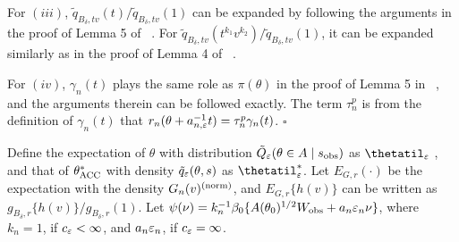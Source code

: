 \documentclass{article}
\begin{document}
	For $(iii)$, $\tilde{q}_{B_{\delta},tv}(t)/\tilde{q}_{B_{\delta},tv}(1)$
	can be expanded by following the arguments in the proof of Lemma 5
	of ~\cite{Li2016}. For $\tilde{q}_{B_{\delta},tv}(t^{k_{1}}v^{k_{2}})/\tilde{q}_{B_{\delta},tv}(1)$,
	it can be expanded similarly as in the proof of Lemma 4 of ~\cite{Li2017}.
	
	For $(iv)$, $\gamma_{n}(t)$ plays the same role as $\pi(\theta)$
	in the proof of Lemma 5 in ~\cite{Li2016}, and the arguments therein
	can be followed exactly. The term $\tau_{n}^{p}$ is from the definition
	of $\gamma_{n}(t)$ that $r_{n}(\theta+a_{n,\varepsilon}^{-1}t)=\tau_{n}^{p}\gamma_{n}(t)$.
	\hfill{$\square$} 

Define the expectation of $\theta$ with distribution $\tilde{Q}_{\varepsilon}(\theta\in A\mid s_{\rm obs})$
as $\thetatil_{\veps}$ , and that of $\theta_{{\rm ACC}}^{*}$
with density $\tilde{q}_{\varepsilon}(\theta,s)$ as $\thetatil_{\veps}^{*}$.
Let $E_{G,r}(\cdot)$ be the expectation with the density $G_{n}(v)^{({\rm norm})}$,
and $E_{G,r}\{h(v)\}$ can be written as $g_{B_{\delta},r}\{h(v)\}/g_{B_{\delta},r}(1)$.
Let $\psi(\nu)=k_{n}^{-1}\beta_{0}\{A(\theta_{0})^{1/2}W_{\rm obs}+a_{n}\varepsilon_{n}\nu\}$,
where $k_{n}=1$, if $c_{\varepsilon}<\infty$, and $a_{n}\varepsilon_{n}$,
if $c_{\varepsilon}=\infty$. 
\end{document}
